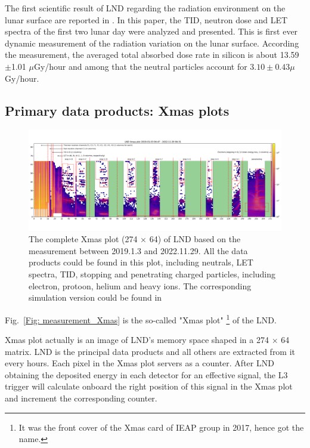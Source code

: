 The first scientific result of \ac{LND} regarding the radiation environment on the lunar surface are reported in \citep{Zhang-2020-LND-firstresults}. In this paper, the \ac{TID}, neutron dose and \ac{LET} spectra of the first two lunar day were analyzed and presented. This is first ever dynamic measurement of the radiation variation on the lunar surface. According the measurement, the averaged total absorbed dose rate in silicon is about 13.59$\pm$1.01 $\mu$Gy/hour and among that the neutral particles account for $3.10 \pm 0.43 \mu$Gy/hour. 



\subsection{Primary data products: Xmas plots}
\begin{figure}
    \centerfloat
    \includegraphics[width =\textheight, height = 0.6\textheight, angle = 90]{images/xmas-2019-01-03To2022-11-29.png}
    \caption[LND Xmas plot based on the measurement between 2019.1.3 and 2022.11.29]{The complete Xmas plot (274 $\times$ 64) of LND based on the measurement between 2019.1.3 and 2022.11.29. All the data products could be found in this plot, including neutrals, \ac{LET} spectra, \ac{TID}, stopping and penetrating charged particles, including electron, protoon, helium and heavy ions. The corresponding simulation version could be found in \citep{Wimmer2020SSRv}}
    \label{Fig:measurement_Xmas}
\end{figure}
\clearpage
Fig.~\ref{Fig: measurement_Xmas} is the so-called "Xmas plot" \footnote{It was the front cover of the Xmas card of IEAP group in 2017, hence got the name.} of the LND. 

Xmas plot actually is an image of \ac{LND}'s memory space shaped in a 274 $\times$ 64 matrix. LND is the principal data products and all others are extracted from it every hours. Each pixel in the Xmas plot servers as a counter. After LND obtaining the deposited energy in each detector for an effective signal, the L3 trigger will calculate onboard the right position of this signal in the Xmas plot and increment the corresponding counter. 

